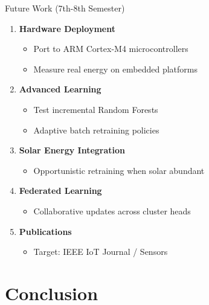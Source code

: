\documentclass[aspectratio=169]{beamer}
\begin{document}
\begin{frame}{Future Work (7th-8th Semester)}
\begin{enumerate}
    \item \textbf{Hardware Deployment}
    \begin{itemize}
        \item Port to ARM Cortex-M4 microcontrollers
        \item Measure real energy on embedded platforms
    \end{itemize}

    \item \textbf{Advanced Learning}
    \begin{itemize}
        \item Test incremental Random Forests
        \item Adaptive batch retraining policies
    \end{itemize}

    \item \textbf{Solar Energy Integration}
    \begin{itemize}
        \item Opportunistic retraining when solar abundant
    \end{itemize}

    \item \textbf{Federated Learning}
    \begin{itemize}
        \item Collaborative updates across cluster heads
    \end{itemize}

    \item \textbf{Publications}
    \begin{itemize}
        \item Target: IEEE IoT Journal / Sensors
    \end{itemize}
\end{enumerate}
\end{frame}

\section{Conclusion}
\end{document}
